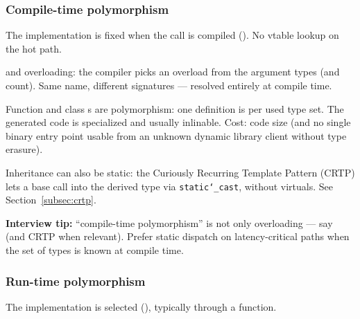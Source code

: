 \subsubsection*{Compile-time polymorphism}
\label{subsec:compile-time-poly}
The implementation is fixed when the call is compiled 
(). No vtable lookup on the hot path.

 and  overloading: the compiler 
picks an overload from the argument types (and count). Same name, different 
signatures --- resolved entirely at compile time.

Function and class s are  
polymorphism: one definition is  per used type set. 
The generated code is specialized and usually inlinable. Cost: code size 
(and no single binary entry point usable from an unknown dynamic library 
client without type erasure).

Inheritance can also be static: the Curiously Recurring Template Pattern 
(CRTP) lets a base call into the derived type via \texttt{static\char`_cast}, 
without virtuals. See Section~\ref{subsec:crtp}.

\par\noindent\textbf{Interview tip:} ``compile-time polymorphism'' is not only 
overloading --- say  (and CRTP when relevant). Prefer static 
dispatch on latency-critical paths when the set of types is known at compile time.

\subsubsection*{Run-time polymorphism}
\label{subsec:run-time-poly}
The implementation is selected  
(), typically through a 
 function.

